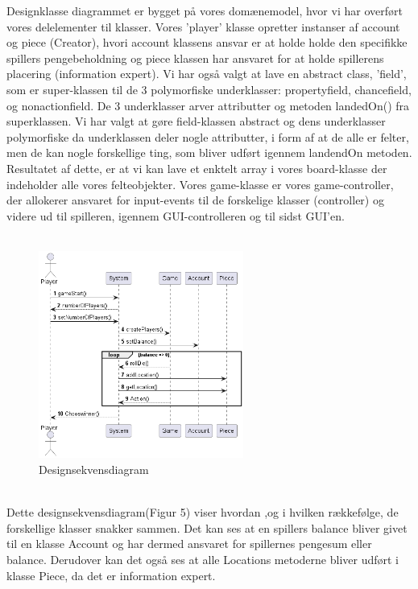 \documentclass{article}
\begin{document}
Designklasse diagrammet er bygget på vores domænemodel, hvor vi har overført vores delelementer til klasser.  Vores 'player' klasse opretter instanser af account og piece (Creator), hvori account klassens ansvar er at holde holde den specifikke spillers pengebeholdning og piece klassen har ansvaret for at holde spillerens placering (information expert).
Vi har også valgt at lave en abstract class, 'field', som er super-klassen til de 3 polymorfiske underklasser: propertyfield, chancefield, og nonactionfield. De 3 underklasser arver attributter og metoden landedOn() fra superklassen. Vi har valgt at gøre field-klassen abstract og dens underklasser polymorfiske da underklassen deler nogle attributter, i form af at de alle er felter, men de kan nogle forskellige ting, som bliver udført igennem landendOn metoden. Resultatet af dette, er at vi kan lave et enktelt array i vores board-klasse der indeholder alle vores felteobjekter.
Vores game-klasse er vores game-controller, der allokerer ansvaret for input-events til de forskelige klasser (controller) og videre ud til spilleren, igennem GUI-controlleren og til sidst GUI'en.
\\
\\
\begin{figure} [h]
    \centering
    \includegraphics[width = 0.6\textwidth]{Billeder/DesignSequenceDiagram.png}
    \caption{Designsekvensdiagram}
    \label{Designsekvensdiagram}
\end{figure}
\\
Dette designsekvensdiagram(Figur 5) viser hvordan ,og i hvilken rækkefølge, de forskellige klasser snakker sammen. Det kan ses at en  spillers balance bliver givet til en klasse Account og har dermed ansvaret for spillernes pengesum eller balance. Derudover kan det også ses at alle Locations metoderne bliver udført i klasse Piece, da det er information expert. 
\\
\\
\end{document}
